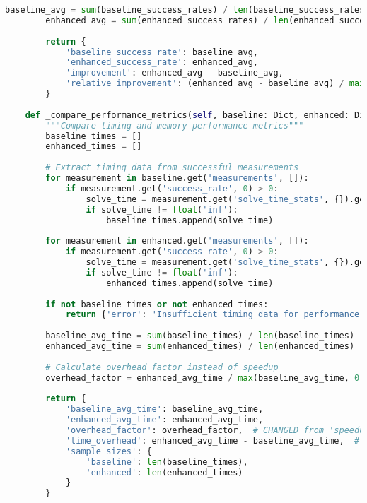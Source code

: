 \begin{lstlisting}[language=Python, caption=Statistical Analysis and Comparison Framework]
        baseline_avg = sum(baseline_success_rates) / len(baseline_success_rates)
        enhanced_avg = sum(enhanced_success_rates) / len(enhanced_success_rates)
        
        return {
            'baseline_success_rate': baseline_avg,
            'enhanced_success_rate': enhanced_avg,
            'improvement': enhanced_avg - baseline_avg,
            'relative_improvement': (enhanced_avg - baseline_avg) / max(baseline_avg, 0.001)
        }
    
    def _compare_performance_metrics(self, baseline: Dict, enhanced: Dict) -> Dict:
        """Compare timing and memory performance metrics"""
        baseline_times = []
        enhanced_times = []
        
        # Extract timing data from successful measurements
        for measurement in baseline.get('measurements', []):
            if measurement.get('success_rate', 0) > 0:
                solve_time = measurement.get('solve_time_stats', {}).get('mean', float('inf'))
                if solve_time != float('inf'):
                    baseline_times.append(solve_time)
        
        for measurement in enhanced.get('measurements', []):
            if measurement.get('success_rate', 0) > 0:
                solve_time = measurement.get('solve_time_stats', {}).get('mean', float('inf'))
                if solve_time != float('inf'):
                    enhanced_times.append(solve_time)
        
        if not baseline_times or not enhanced_times:
            return {'error': 'Insufficient timing data for performance comparison'}
        
        baseline_avg_time = sum(baseline_times) / len(baseline_times)
        enhanced_avg_time = sum(enhanced_times) / len(enhanced_times)
        
        # Calculate overhead factor instead of speedup
        overhead_factor = enhanced_avg_time / max(baseline_avg_time, 0.001)
        
        return {
            'baseline_avg_time': baseline_avg_time,
            'enhanced_avg_time': enhanced_avg_time,
            'overhead_factor': overhead_factor,  # CHANGED from 'speedup_factor'
            'time_overhead': enhanced_avg_time - baseline_avg_time,  # CHANGED from 'time_improvement'
            'sample_sizes': {
                'baseline': len(baseline_times),
                'enhanced': len(enhanced_times)
            }
        }
        

\end{lstlisting}
